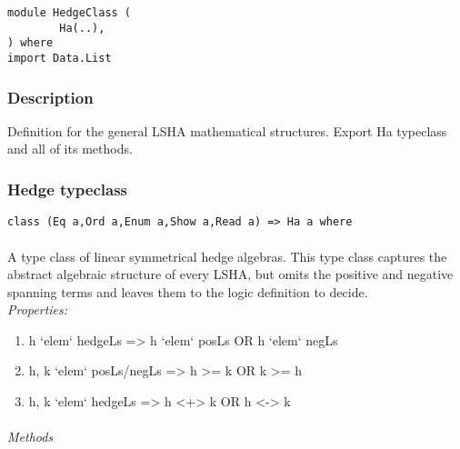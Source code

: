 \documentclass[../gr-final.tex]{subfiles}
\begin{document}
\begin{lstlisting}
module HedgeClass (
        Ha(..),
) where
import Data.List
\end{lstlisting}

\subsubsection{Description} Definition for the general LSHA mathematical
structures. Export Ha typeclass and all of its methods.
\subsubsection{Hedge typeclass}
\begin{lstlisting}
class (Eq a,Ord a,Enum a,Show a,Read a) => Ha a where
\end{lstlisting}

\paragraph{} A type class of linear symmetrical hedge algebras. This type
class captures the abstract algebraic structure of every LSHA,
but omits the positive and negative spanning terms and leaves
them to the logic definition to decide.\\

\emph{Properties:}
\begin{enumerate}
        \item h `elem` hedgeLs => h `elem` posLs OR h `elem` negLs
        \item h, k `elem` posLs/negLs => h >= k OR k >= h
        \item h, k `elem` hedgeLs => h <+> k OR h <-> k
\end{enumerate}
\paragraph{}
\emph{Methods}
\end{document}
